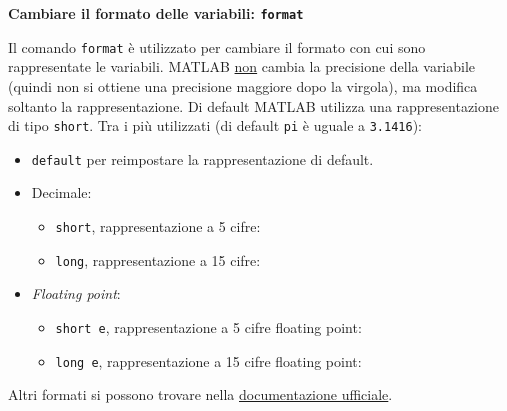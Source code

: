 \documentclass[a4paper]{article}
\begin{document}
    \begin{flushleft}
        \large
        \hypertarget{
            lab: Cambiare il formato delle variabili: format
        }{
            \textcolor{Red3}{\textbf{Cambiare il formato delle variabili: \texttt{format}}}
        }
        \label{lab: Cambiare il formato delle variabili: format}
    \end{flushleft}
    Il comando \texttt{format} è utilizzato per cambiare il formato con cui sono rappresentate le variabili. MATLAB \underline{non} cambia la precisione della variabile (quindi non si ottiene una precisione maggiore dopo la virgola), ma modifica soltanto la rappresentazione. Di default MATLAB utilizza una rappresentazione di tipo \texttt{short}. Tra i più utilizzati (di default \texttt{pi} è uguale a \texttt{3.1416}):
    \begin{itemize}
        \item \texttt{default} per reimpostare la rappresentazione di default.

        \item Decimale:
        \begin{itemize}
            \item \texttt{short}, rappresentazione a 5 cifre:
            

            \item \texttt{long}, rappresentazione a 15 cifre:
            
        \end{itemize}

        \item \emph{Floating point}:
        \begin{itemize}
            \item \texttt{short e}, rappresentazione a 5 cifre floating point:
            

            \item \texttt{long e}, rappresentazione a 15 cifre floating point:
            
        \end{itemize}
    \end{itemize}
    Altri formati si possono trovare nella \href{https://uk.mathworks.com/help/releases/R2024a/matlab/ref/format.html#btiwmh5-1-style}{documentazione ufficiale}.
\end{document}
